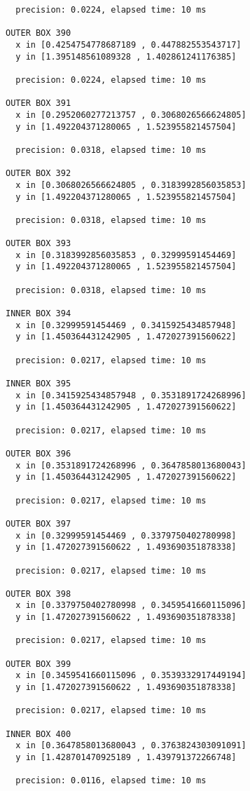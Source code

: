 \begin{verbatim}
  precision: 0.0224, elapsed time: 10 ms

OUTER BOX 390
  x in [0.4254754778687189 , 0.447882553543717]
  y in [1.395148561089328 , 1.402861241176385]

  precision: 0.0224, elapsed time: 10 ms

OUTER BOX 391
  x in [0.2952060277213757 , 0.3068026566624805]
  y in [1.492204371280065 , 1.523955821457504]

  precision: 0.0318, elapsed time: 10 ms

OUTER BOX 392
  x in [0.3068026566624805 , 0.3183992856035853]
  y in [1.492204371280065 , 1.523955821457504]

  precision: 0.0318, elapsed time: 10 ms

OUTER BOX 393
  x in [0.3183992856035853 , 0.32999591454469]
  y in [1.492204371280065 , 1.523955821457504]

  precision: 0.0318, elapsed time: 10 ms

INNER BOX 394
  x in [0.32999591454469 , 0.3415925434857948]
  y in [1.450364431242905 , 1.472027391560622]

  precision: 0.0217, elapsed time: 10 ms

INNER BOX 395
  x in [0.3415925434857948 , 0.3531891724268996]
  y in [1.450364431242905 , 1.472027391560622]

  precision: 0.0217, elapsed time: 10 ms

OUTER BOX 396
  x in [0.3531891724268996 , 0.3647858013680043]
  y in [1.450364431242905 , 1.472027391560622]

  precision: 0.0217, elapsed time: 10 ms

OUTER BOX 397
  x in [0.32999591454469 , 0.3379750402780998]
  y in [1.472027391560622 , 1.493690351878338]

  precision: 0.0217, elapsed time: 10 ms

OUTER BOX 398
  x in [0.3379750402780998 , 0.3459541660115096]
  y in [1.472027391560622 , 1.493690351878338]

  precision: 0.0217, elapsed time: 10 ms

OUTER BOX 399
  x in [0.3459541660115096 , 0.3539332917449194]
  y in [1.472027391560622 , 1.493690351878338]

  precision: 0.0217, elapsed time: 10 ms

INNER BOX 400
  x in [0.3647858013680043 , 0.3763824303091091]
  y in [1.428701470925189 , 1.439791372266748]

  precision: 0.0116, elapsed time: 10 ms


\end{verbatim}
